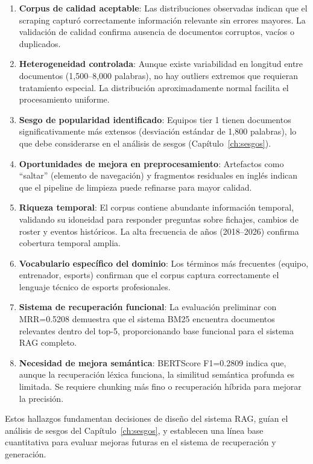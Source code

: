 \begin{enumerate}
    \item \textbf{Corpus de calidad aceptable}: Las distribuciones observadas indican que el scraping capturó correctamente información relevante sin errores mayores. La validación de calidad confirma ausencia de documentos corruptos, vacíos o duplicados.
    
    \item \textbf{Heterogeneidad controlada}: Aunque existe variabilidad en longitud entre documentos (1,500--8,000 palabras), no hay outliers extremos que requieran tratamiento especial. La distribución aproximadamente normal facilita el procesamiento uniforme.
    
    \item \textbf{Sesgo de popularidad identificado}: Equipos tier 1 tienen documentos significativamente más extensos (desviación estándar de 1,800 palabras), lo que debe considerarse en el análisis de sesgos (Capítulo~\ref{ch:sesgos}).
    
    \item \textbf{Oportunidades de mejora en preprocesamiento}: Artefactos como ``saltar'' (elemento de navegación) y fragmentos residuales en inglés indican que el pipeline de limpieza puede refinarse para mayor calidad.
    
    \item \textbf{Riqueza temporal}: El corpus contiene abundante información temporal, validando su idoneidad para responder preguntas sobre fichajes, cambios de roster y eventos históricos. La alta frecuencia de años (2018--2026) confirma cobertura temporal amplia.
    
    \item \textbf{Vocabulario específico del dominio}: Los términos más frecuentes (equipo, entrenador, esports) confirman que el corpus captura correctamente el lenguaje técnico de esports profesionales.
    
    \item \textbf{Sistema de recuperación funcional}: La evaluación preliminar con MRR=0.5208 demuestra que el sistema BM25 encuentra documentos relevantes dentro del top-5, proporcionando base funcional para el sistema RAG completo.
    
    \item \textbf{Necesidad de mejora semántica}: BERTScore F1=0.2809 indica que, aunque la recuperación léxica funciona, la similitud semántica profunda es limitada. Se requiere chunking más fino o recuperación híbrida para mejorar la precisión.
\end{enumerate}

Estos hallazgos fundamentan decisiones de diseño del sistema RAG, guían el análisis de sesgos del Capítulo~\ref{ch:sesgos}, y establecen una línea base cuantitativa para evaluar mejoras futuras en el sistema de recuperación y generación.
